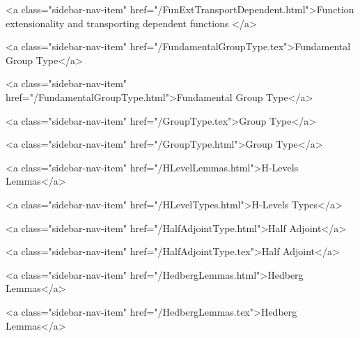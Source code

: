           <a class="sidebar-nav-item" href="/FunExtTransportDependent.html">Function extensionality and transporting dependent functions </a>
        
      
    
      
        
          <a class="sidebar-nav-item" href="/FundamentalGroupType.tex">Fundamental Group Type</a>
        
      
    
      
        
          <a class="sidebar-nav-item" href="/FundamentalGroupType.html">Fundamental Group Type</a>
        
      
    
      
        
          <a class="sidebar-nav-item" href="/GroupType.tex">Group Type</a>
        
      
    
      
        
          <a class="sidebar-nav-item" href="/GroupType.html">Group Type</a>
        
      
    
      
        
          <a class="sidebar-nav-item" href="/HLevelLemmas.html">H-Levels Lemmas</a>
        
      
    
      
        
          <a class="sidebar-nav-item" href="/HLevelTypes.html">H-Levels Types</a>
        
      
    
      
        
          <a class="sidebar-nav-item" href="/HalfAdjointType.html">Half Adjoint</a>
        
      
    
      
        
          <a class="sidebar-nav-item" href="/HalfAdjointType.tex">Half Adjoint</a>
        
      
    
      
        
          <a class="sidebar-nav-item" href="/HedbergLemmas.html">Hedberg Lemmas</a>
        
      
    
      
        
          <a class="sidebar-nav-item" href="/HedbergLemmas.tex">Hedberg Lemmas</a>
        
